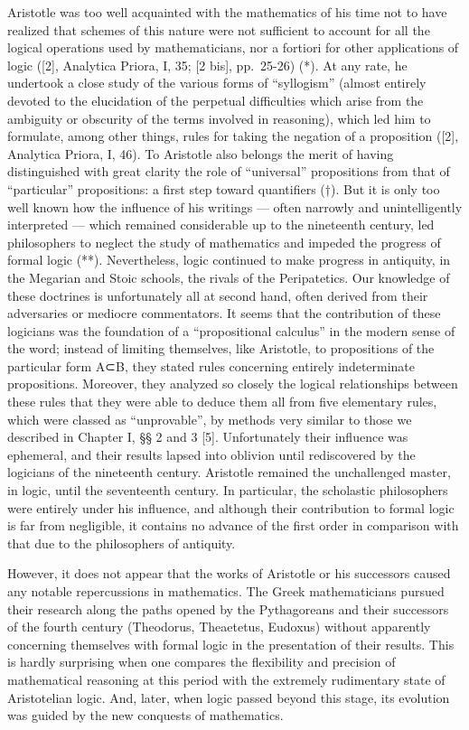 Aristotle was too well acquainted with the mathematics of his time not to have realized that schemes of this nature were not sufficient to account for all the logical operations used by mathematicians, nor a fortiori for other applications of logic ({[}2{]}, Analytica Priora, I, 35; {[}2 bis{]}, pp.~25-26) (*). At any rate, he undertook a close study of the various forms of ``syllogism'' (almost entirely devoted to the elucidation of the perpetual difficulties which arise from the ambiguity or obscurity of the terms involved in reasoning), which led him to formulate, among other things, rules for taking the negation of a proposition ({[}2{]}, Analytica Priora, I, 46). To Aristotle also belongs the merit of having distinguished with great clarity the role of ``universal'' propositions from that of ``particular'' propositions: a first step toward quantifiers (†). But it is only too well known how the influence of his writings --- often narrowly and unintelligently interpreted --- which remained considerable up to the nineteenth century, led philosophers to neglect the study of mathematics and impeded the progress of formal logic (**). Nevertheless, logic continued to make progress in antiquity, in the Megarian and Stoic schools, the rivals of the Peripatetics. Our knowledge of these doctrines is unfortunately all at second hand, often derived from their adversaries or mediocre commentators. It seems that the contribution of these logicians was the foundation of a ``propositional calculus'' in the modern sense of the word; instead of limiting themselves, like Aristotle, to propositions of the particular form A⊂B, they stated rules concerning entirely indeterminate propositions. Moreover, they analyzed so closely the logical relationships between these rules that they were able to deduce them all from five elementary rules, which were classed as ``unprovable'', by methods very similar to those we described in Chapter I, §§ 2 and 3 {[}5{]}. Unfortunately their influence was ephemeral, and their results lapsed into oblivion until rediscovered by the logicians of the nineteenth century. Aristotle remained the unchallenged master, in logic, until the seventeenth century. In particular, the scholastic philosophers were entirely under his influence, and although their contribution to formal logic is far from negligible, it contains no advance of the first order in comparison with that due to the philosophers of antiquity.

However, it does not appear that the works of Aristotle or his successors caused any notable repercussions in mathematics. The Greek mathematicians pursued their research along the paths opened by the Pythagoreans and their successors of the fourth century (Theodorus, Theaetetus, Eudoxus) without apparently concerning themselves with formal logic in the presentation of their results. This is hardly surprising when one compares the flexibility and precision of mathematical reasoning at this period with the extremely rudimentary state of Aristotelian logic. And, later, when logic passed beyond this stage, its evolution was guided by the new conquests of mathematics.

